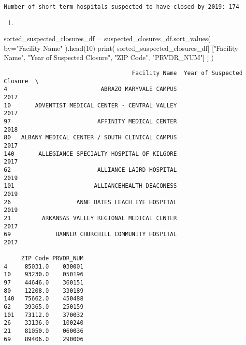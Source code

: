 \documentclass[
  letterpaper,
  DIV=11,
  numbers=noendperiod]{scrartcl}
\newenvironment{Shaded}{\begin{snugshade}}{\end{snugshade}}
\newcommand{\BuiltInTok}[1]{\textcolor[rgb]{0.00,0.23,0.31}{#1}}
\newcommand{\DecValTok}[1]{\textcolor[rgb]{0.68,0.00,0.00}{#1}}
\newcommand{\NormalTok}[1]{\textcolor[rgb]{0.00,0.23,0.31}{#1}}
\newcommand{\OperatorTok}[1]{\textcolor[rgb]{0.37,0.37,0.37}{#1}}
\newcommand{\StringTok}[1]{\textcolor[rgb]{0.13,0.47,0.30}{#1}}
\providecommand{\tightlist}{%
  \setlength{\itemsep}{0pt}\setlength{\parskip}{0pt}}\usepackage{longtable,booktabs,array}
\begin{document}
\begin{verbatim}
Number of short-term hospitals suspected to have closed by 2019: 174
\end{verbatim}

\begin{enumerate}
\def\labelenumi{\arabic{enumi}.}
\setcounter{enumi}{1}
\tightlist
\item
\end{enumerate}

\begin{Shaded}
\begin{Highlighting}[]
\NormalTok{sorted\_suspected\_closures\_df }\OperatorTok{=}\NormalTok{ suspected\_closures\_df.sort\_values(}
\NormalTok{    by}\OperatorTok{=}\StringTok{"Facility Name"}
\NormalTok{).head(}\DecValTok{10}\NormalTok{)}
\BuiltInTok{print}\NormalTok{(}
\NormalTok{    sorted\_suspected\_closures\_df[}
\NormalTok{        [}\StringTok{"Facility Name"}\NormalTok{, }\StringTok{"Year of Suspected Closure"}\NormalTok{, }\StringTok{"ZIP Code"}\NormalTok{, }\StringTok{"PRVDR\_NUM"}\NormalTok{]}
\NormalTok{    ]}
\NormalTok{)}
\end{Highlighting}
\end{Shaded}

\begin{verbatim}
                                     Facility Name  Year of Suspected Closure  \
4                           ABRAZO MARYVALE CAMPUS                       2017   
10       ADVENTIST MEDICAL CENTER - CENTRAL VALLEY                       2017   
97                         AFFINITY MEDICAL CENTER                       2018   
80   ALBANY MEDICAL CENTER / SOUTH CLINICAL CAMPUS                       2017   
140       ALLEGIANCE SPECIALTY HOSPITAL OF KILGORE                       2017   
62                         ALLIANCE LAIRD HOSPITAL                       2019   
101                       ALLIANCEHEALTH DEACONESS                       2019   
26                   ANNE BATES LEACH EYE HOSPITAL                       2019   
21         ARKANSAS VALLEY REGIONAL MEDICAL CENTER                       2017   
69             BANNER CHURCHILL COMMUNITY HOSPITAL                       2017   

     ZIP Code PRVDR_NUM  
4     85031.0    030001  
10    93230.0    050196  
97    44646.0    360151  
80    12208.0    330189  
140   75662.0    450488  
62    39365.0    250159  
101   73112.0    370032  
26    33136.0    100240  
21    81050.0    060036  
69    89406.0    290006  
\end{verbatim}
\end{document}
